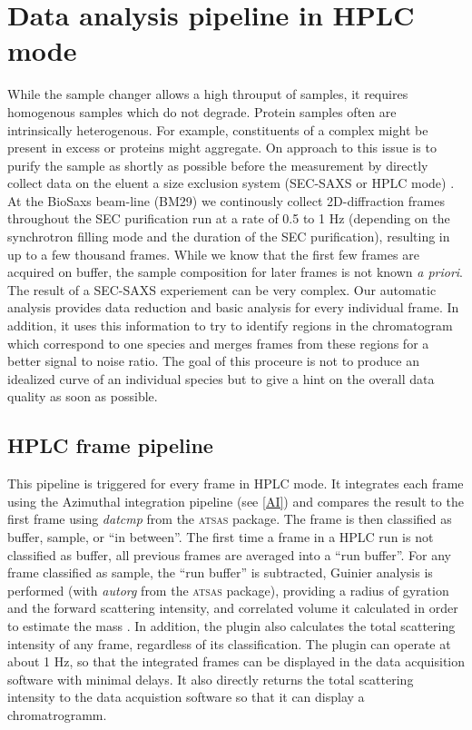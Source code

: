 \documentclass[preprint,pdf]{iucr}              %
\begin{document}
\section{Data analysis pipeline in HPLC mode}
While the sample changer allows a high throuput of samples, it requires
homogenous samples which do not degrade. 
Protein samples often are intrinsically heterogenous. 
For example, constituents of a complex might be present in excess or proteins
might aggregate.  
On approach to this issue is to purify the sample as shortly as possible before 
the measurement by directly collect data on the eluent a size exclusion system 
(SEC-SAXS or HPLC mode) \cite{SECPaper2012, otherSEC}. 
At the BioSaxs beam-line (BM29) we continously collect 2D-diffraction frames
throughout the SEC purification run at a rate of 0.5 to 1 Hz 
(depending on the synchrotron filling mode and the duration of the SEC purification), 
resulting in up to a few thousand frames. 
While we know that the first few frames are acquired on buffer, the sample composition 
for later frames is not known \textit{a priori}. 
The result of a SEC-SAXS experiement can be very complex. 
Our automatic analysis provides data reduction and basic analysis for every
individual frame. 
In addition, it uses this information to try to identify regions in the
chromatogram which correspond to one species and merges frames from these
regions for a better signal to noise ratio. 
The goal of this proceure is not to produce an idealized curve of an individual
species but to give a hint on the overall data quality as soon as possible.

\subsection{HPLC frame pipeline}

This pipeline is triggered for every frame in HPLC mode. 
It integrates each frame using the Azimuthal integration pipeline (see \ref{AI})
and compares the result to the first frame using \textit{datcmp} from the
\textsc{atsas} package. 
The frame is then classified as buffer, sample, or ``in between''. 
The first time a frame in a HPLC run is not classified as buffer, all previous
frames are averaged into a ``run buffer''. 
For any frame classified as sample, the ``run buffer'' is subtracted, Guinier
analysis is performed (with \textit{autorg} from the \textsc{atsas} package), 
providing a radius of gyration and the forward scattering intensity, and
correlated volume it calculated in order to estimate the mass
\cite{RamboTainerNature2013}. 
In addition, the plugin also calculates the total scattering intensity of any
frame, regardless of its classification.
The plugin can operate at about 1 Hz, so that the integrated frames can be
displayed in the data acquisition software with minimal delays. 
It also directly returns the total scattering intensity to the data acquistion
software so that it can display a chromatrogramm. 
\end{document}
